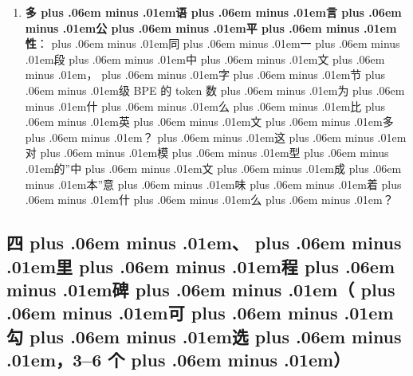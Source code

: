 \documentclass[
]{article}
\def\zh#1{{\zhfont #1}}
\def\zhglue{\hskip0pt plus .06em minus .01em}
\begin{document}
\begin{enumerate}
\item
  \textbf{\zh{多\zhglue 语\zhglue 言\zhglue 公\zhglue 平\zhglue 性}}\zh{：\zhglue 同\zhglue 一\zhglue 段\zhglue 中\zhglue 文\zhglue ，\zhglue 字\zhglue 节\zhglue 级} BPE \zh{的} token \zh{数\zhglue 为\zhglue 什\zhglue 么\zhglue 比\zhglue 英\zhglue 文\zhglue 多\zhglue ？\zhglue 这\zhglue 对\zhglue 模\zhglue 型\zhglue 的}''\zh{中\zhglue 文\zhglue 成\zhglue 本}''\zh{意\zhglue 味\zhglue 着\zhglue 什\zhglue 么\zhglue ？}
\end{enumerate}

\subsection{\zh{四\zhglue 、\zhglue 里\zhglue 程\zhglue 碑\zhglue （\zhglue 可\zhglue 勾\zhglue 选\zhglue ，}3--6 \zh{个\zhglue ）}}\label{ux56dbux91ccux7a0bux7891ux53efux52feux900936-ux4e2a}
\end{document}
